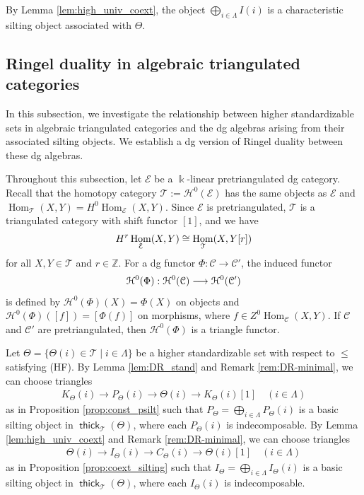 \documentclass[a4paper,reqno,11pt]{amsart}
\numberwithin{equation}{section}
\theoremstyle{definition}
\newcommand{\C}{\mathcal{C}}
\newcommand{\E}{\mathcal{E}}
\renewcommand{\H}{\mathcal{H}}
\newcommand{\T}{\mathcal{T}}
\newcommand{\ZZ}{\mathbb{Z}}
\newcommand{\bte}{\Theta}
\newcommand{\kk}{\Bbbk}
\DeclareMathOperator{\thick}{\mathsf{thick}}
\DeclareMathOperator{\Hom}{Hom}
\begin{document}
By Lemma \ref{lem:high_univ_coext}, the object $\bigoplus_{i\in\Lambda}I(i)$ is a characteristic silting object associated with $\bte$.



\subsection{Ringel duality in algebraic triangulated categories}\label{subsection:Ringel_alg}

In this subsection, we investigate the relationship between higher standardizable sets in algebraic triangulated categories and the dg algebras arising from their associated silting objects.
We establish a dg version of Ringel duality between these dg algebras.

Throughout this subsection, let $\E$ be a $\kk$-linear pretriangulated dg category.
Recall that the homotopy category $\T:=\H^{0}(\E)$ has the same objects as $\E$ and $\Hom_{\T}(X,Y)=H^{0}\Hom_{\E}(X,Y)$.
Since $\E$ is pretriangulated, $\T$ is a triangulated category with shift functor $[1]$, and we have
\begin{align}
H^{r}\Hom_{\E}(X,Y)\cong\Hom_{\T}(X,Y[r])\notag
\end{align}
for all $X,Y\in\T$ and $r\in\ZZ$.
For a dg functor $\Phi:\C\to\C'$, the induced functor
\begin{align}
\H^{0}(\Phi):\H^{0}(\C)\longrightarrow\H^{0}(\C')\notag
\end{align}
is defined by $\H^{0}(\Phi)(X)=\Phi(X)$ on objects and $\H^{0}(\Phi)([f])=[\Phi(f)]$ on morphisms, where $f\in Z^{0}\Hom_{\C}(X,Y)$.
If $\C$ and $\C'$ are pretriangulated, then $\H^{0}(\Phi)$ is a triangle functor.

Let $\bte=\{\bte(i)\in\T\mid i\in\Lambda\}$ be a higher standardizable set with respect to $\leq$ satisfying (HF).
By Lemma \ref{lem:DR_stand} and Remark \ref{rem:DR-minimal}, we can choose triangles
\begin{align}\label{eq:P_tri}
K_{\bte}(i)\to P_{\bte}(i)\to \bte(i)\to K_{\bte}(i)[1]\quad(i\in\Lambda)
\end{align}
as in Proposition \ref{prop:const_psilt} such that $P_{\bte}=\bigoplus_{i\in\Lambda}P_{\bte}(i)$ is a basic silting object in $\thick_{\T}(\bte)$, where each $P_{\bte}(i)$ is indecomposable.
By Lemma \ref{lem:high_univ_coext} and Remark \ref{rem:DR-minimal}, we can choose triangles
\begin{align}\label{eq:I_tri}
\bte(i)\to I_{\bte}(i)\to C_{\bte}(i)\to\bte(i)[1]\quad(i\in\Lambda)
\end{align}
as in Proposition \ref{prop:coext_silting} such that $I_{\bte}=\bigoplus_{i\in\Lambda}I_{\bte}(i)$ is a basic silting object in $\thick_{\T}(\bte)$, where each $I_{\bte}(i)$ is indecomposable.
\end{document}
